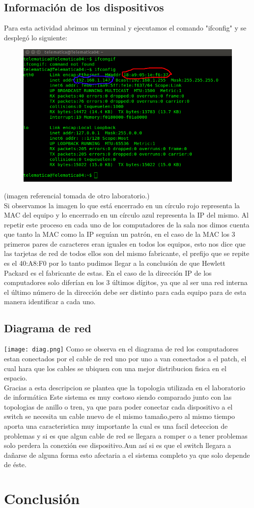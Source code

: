 \documentclass{udpreport}
\begin{document}
\section{Información de los dispositivos}
Para esta actividad abrimos un terminal y ejecutamos el comando "ifconfig" y se desplegó lo siguiente:\\
\begin{figure}[h]
    \centering
    \includegraphics[width=\textwidth]{Terminal.png}
\end{figure}
(imagen referencial tomada de otro laboratorio.)\\
Si observamos la imagen lo que está encerrado en un círculo rojo representa la MAC del equipo y lo encerrado en un círculo azul representa la IP del mismo. Al repetir este proceso en cada uno de los computadores de la sala nos dimos cuenta que tanto la MAC como la IP seguían un patrón, en el caso de la MAC los 3 primeros pares de caracteres eran iguales en todos los equipos, esto nos dice que las tarjetas de red de todos ellos son del mismo fabricante, el prefijo que se repite es el 40:A8:F0 por lo tanto pudimos llegar a la conclusión de que Hewlett Packard es el fabricante de estas. En el caso de la dirección IP de los computadores solo diferían en los 3 últimos dígitos, ya que al ser una red interna el último número de la dirección debe ser distinto para cada equipo para de esta manera identificar a cada uno.
\section{Diagrama de red}
\texttt{[image: diag.png]}
Como se observa en el diagrama de red los computadores estan conectados por el cable de red uno por uno 
a van conectados a el patch, el cual hara que los cables se ubiquen con una mejor distribucion fisica 
en el espacio.\\
Gracias a esta descripcion se plantea que la topologia utilizada en el laboratorio de informática
Este sistema es muy costoso siendo comparado junto con las topologias de anillo o tren, ya que para poder
conectar cada dispositivo a el switch se necesita un cable nuevo de el mismo tamaño,pero al mismo tiempo
aporta una caracteristica muy importante la cual es una facil deteccion de problemas y si es que algun
cable de red se llegara a romper o a tener problemas solo perdera la conexión  ese dispositivo.Aun así 
si es que el switch llegara a dañarse de alguna forma esto afectaria a el sistema completo ya que solo
depende de éste.

\chapter{Conclusión}
\end{document}
